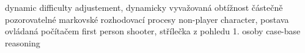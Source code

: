 \abbrv[DDA]  dynamic difficulty adjustement, dynamicky vyvažovaná obtížnost
\abbrv[POMDP]     částečně pozorovatelné markovské rozhodovací procesy
\abbrv[NPC]			non-player character, postava ovládaná počítačem
\abbrv[FPS]     first person shooter, střílečka z pohledu 1. osoby
\abbrv[CBR]    case-base reasoning
\stopAbbreviations

\endinput
